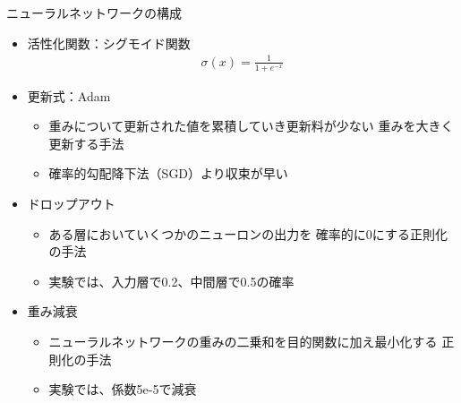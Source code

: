 \documentclass[unicode,10pt]{beamer}
\begin{document}
\begin{frame}{ニューラルネットワークの構成}{}
  \begin{itemize}
    \Large
    \item 活性化関数：シグモイド関数
      \Large
      \begin{gather*}
        \sigma(x) = \frac{1}{1 + e^{-x}}
      \end{gather*}
    \item 更新式：Adam
      \begin{itemize}
        \Large
        \item 重みについて更新された値を累積していき更新料が少ない
              重みを大きく更新する手法
        \item 確率的勾配降下法（SGD）より収束が早い
      \end{itemize}
    \item ドロップアウト
      \begin{itemize}
        \Large
        \item ある層においていくつかのニューロンの出力を
              確率的に0にする正則化の手法
        \item 実験では、入力層で0.2、中間層で0.5の確率
      \end{itemize}
    \item 重み減衰
      \begin{itemize}
        \Large
        \item ニューラルネットワークの重みの二乗和を目的関数に加え最小化する
              正則化の手法
        \item 実験では、係数5e-5で減衰
      \end{itemize}
  \end{itemize}
\end{frame}
\end{document}
